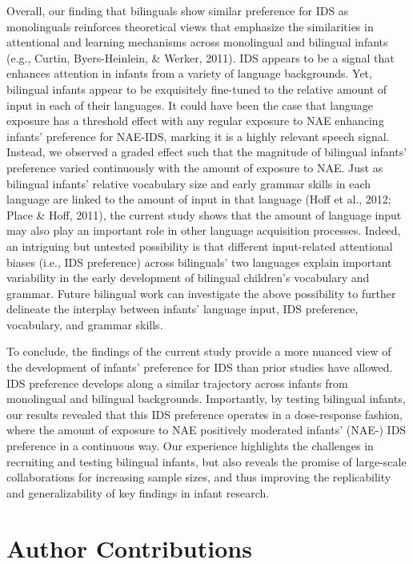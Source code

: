 \documentclass[english,,man,floatsintext]{apa6}
\begin{document}
Overall, our finding that bilinguals show similar preference for IDS as monolinguals reinforces theoretical views that emphasize the similarities in attentional and learning mechanisms across monolingual and bilingual infants (e.g., Curtin, Byers-Heinlein, \& Werker, 2011). IDS appears to be a signal that enhances attention in infants from a variety of language backgrounds. Yet, bilingual infants appear to be exquisitely fine-tuned to the relative amount of input in each of their languages. It could have been the case that language exposure has a threshold effect with any regular exposure to NAE enhancing infants' preference for NAE-IDS, marking it is a highly relevant speech signal. Instead, we observed a graded effect such that the magnitude of bilingual infants' preference varied continuously with the amount of exposure to NAE. Just as bilingual infants' relative vocabulary size and early grammar skills in each language are linked to the amount of input in that language (Hoff et al., 2012; Place \& Hoff, 2011), the current study shows that the amount of language input may also play an important role in other language acquisition processes. Indeed, an intriguing but untested possibility is that different input-related attentional biases (i.e., IDS preference) across bilinguals' two languages explain important variability in the early development of bilingual children's vocabulary and grammar. Future bilingual work can investigate the above possibility to further delineate the interplay between infants' language input, IDS preference, vocabulary, and grammar skills.

To conclude, the findings of the current study provide a more nuanced view of the development of infants' preference for IDS than prior studies have allowed. IDS preference develops along a similar trajectory across infants from monolingual and bilingual backgrounds. Importantly, by testing bilingual infants, our results revealed that this IDS preference operates in a dose-response fashion, where the amount of exposure to NAE positively moderated infants' (NAE-) IDS preference in a continuous way. Our experience highlights the challenges in recruiting and testing bilingual infants, but also reveals the promise of large-scale collaborations for increasing sample sizes, and thus improving the replicability and generalizability of key findings in infant research.

\hypertarget{author-contributions}{%
\section{Author Contributions}\label{author-contributions}}
\end{document}
